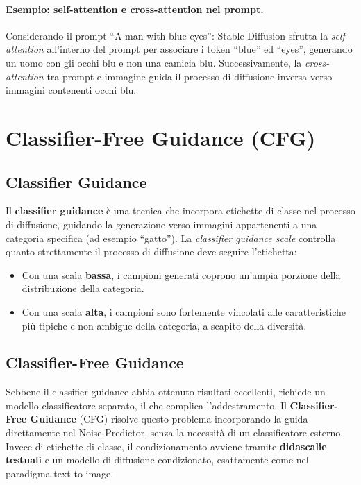 \paragraph{Esempio: self-attention e cross-attention nel prompt.}
Considerando il prompt ``A man with blue eyes'': Stable Diffusion
sfrutta la \emph{self-attention} all'interno del prompt per associare
i token ``blue'' ed ``eyes'', generando un uomo con gli occhi blu e
non una camicia blu. Successivamente, la \emph{cross-attention} tra
prompt e immagine guida il processo di diffusione inversa verso immagini
contenenti occhi blu.

\section{Classifier-Free Guidance (CFG)}
\label{sec:cfg}

\subsection{Classifier Guidance}
\label{subsec:classifier-guidance}

Il \textbf{classifier guidance} è una tecnica che incorpora etichette
di classe nel processo di diffusione, guidando la generazione verso
immagini appartenenti a una categoria specifica (ad esempio ``gatto'').
La \emph{classifier guidance scale} controlla quanto strettamente il
processo di diffusione deve seguire l'etichetta:
\begin{itemize}
  \item Con una scala \textbf{bassa}, i campioni generati coprono
        un'ampia porzione della distribuzione della categoria.
  \item Con una scala \textbf{alta}, i campioni sono fortemente
        vincolati alle caratteristiche più tipiche e non ambigue della
        categoria, a scapito della diversità.
\end{itemize}

\subsection{Classifier-Free Guidance}
\label{subsec:cfg}

Sebbene il classifier guidance abbia ottenuto risultati eccellenti,
richiede un modello classificatore separato, il che complica
l'addestramento. Il \textbf{Classifier-Free Guidance} (CFG) risolve
questo problema incorporando la guida direttamente nel Noise Predictor,
senza la necessità di un classificatore esterno. Invece di etichette
di classe, il condizionamento avviene tramite \textbf{didascalie
testuali} e un modello di diffusione condizionato, esattamente come
nel paradigma text-to-image.

